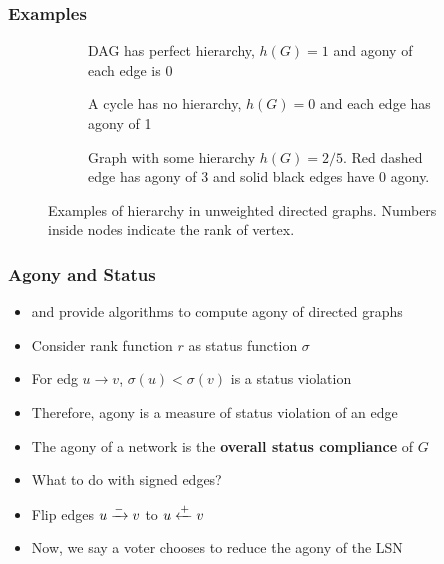 \documentclass{beamer}
\begin{document}
\begin{frame}
    \frametitle{Examples}
    \begin{figure}[!ht]
        \centering
        \begin{subfigure}[t]{0.5\textwidth}
            \centering
            \scalebox{0.5}{}
            \caption{DAG has perfect hierarchy, $h(G)=1$ and agony of each edge is 0}
            \label{fig:dag}
        \end{subfigure}

        \begin{subfigure}[t]{0.4\textwidth}
            \centering
            \scalebox{0.5}{}
            \caption{A cycle has no hierarchy, $h(G)=0$ and each edge has agony of 1}
            \label{fig:cycle}
        \end{subfigure}
        \hspace{4mm}%
        \begin{subfigure}[t]{0.4\textwidth}
            \centering
            \scalebox{0.5}{}
            \caption{Graph with some hierarchy $h(G)=2/5$. Red dashed edge has agony of 3 and solid black edges have 0 agony.  }
            \label{fig:some-hierarchy}
        \end{subfigure}
        \caption{Examples of hierarchy in unweighted directed graphs. Numbers inside nodes indicate the rank of vertex.}
        \label{fig:hierarchy} 
    \end{figure}
\end{frame}

\begin{frame}
    \frametitle{Agony and Status}
    \begin{itemize}
        \item \cite{gupte2011finding} and \cite{tatti2017tiers} provide algorithms to compute agony of directed graphs
        \item Consider rank function $r$ as status function $\sigma$
        \item For edg $u \rightarrow v$, $\sigma(u)<\sigma(v)$ is a status violation
        \item Therefore, agony is a measure of status violation of an edge
        \item The agony of a network is the \textbf{overall status compliance} of $G$
        \item What to do with signed edges?
        \item Flip edges $u \xrightarrow{-} v$ to $u \xleftarrow{+} v$
        \item Now, we say a voter chooses to reduce the agony of the LSN
    \end{itemize}

\end{frame}
\end{document}

